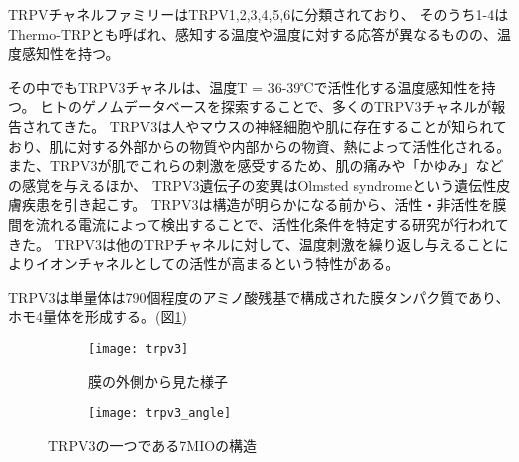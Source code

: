 TRPVチャネルファミリーはTRPV1,2,3,4,5,6に分類されており、
そのうち1-4はThermo-TRPとも呼ばれ、感知する温度や温度に対する応答が異なるものの、温度感知性を持つ。\autocite{baylie_trpv_2011}

その中でもTRPV3チャネルは、温度T = 36-39℃で活性化する温度感知性を持つ。\autocite{baylie_trpv_2011,xuTRPV3CalciumpermeableTemperaturesensitive2002}
ヒトのゲノムデータベースを探索することで、多くのTRPV3チャネルが報告されてきた。\autocite{smithTRPV3TemperaturesensitiveVanilloid2002, xuTRPV3CalciumpermeableTemperaturesensitive2002, peier_heat-sensitive_2002}
TRPV3は人やマウスの神経細胞や肌に存在することが知られており、肌に対する外部からの物質や内部からの物資、熱によって活性化される。%
また、TRPV3が肌でこれらの刺激を感受するため、肌の痛みや「かゆみ」などの感覚を与えるほか、
TRPV3遺伝子の変異はOlmsted syndromeという遺伝性皮膚疾患を引き起こす。\autocite{lin_exome_2012,lai-cheong_recurrent_2012,nilius_trpv_2013}
TRPV3は構造が明らかになる前から、活性・非活性を膜間を流れる電流によって検出することで、活性化条件を特定する研究が行われてきた。
\autocite{smithTRPV3TemperaturesensitiveVanilloid2002,xuTRPV3CalciumpermeableTemperaturesensitive2002,nadezhdinStructuralMechanismHeatinduced2021,chung_2-aminoethoxydiphenyl_2004}
TRPV3は他のTRPチャネルに対して、温度刺激を繰り返し与えることによりイオンチャネルとしての活性が高まるという特性がある。
\autocite{peier_heat-sensitive_2002,chung_2-aminoethoxydiphenyl_2004,liu_hysteresis_2011}

TRPV3は単量体は790個程度のアミノ酸残基で構成された膜タンパク質であり、ホモ4量体を形成する。(図\ref{fig:trpv3})

\begin{figure}
  \centering
  \begin{subfigure}{0.4\textwidth}
    \texttt{[image: trpv3]}
    \caption{膜の外側から見た様子}
    \label{fig:trpv3}
  \end{subfigure}
  \begin{subfigure}{0.4\textwidth}
    \texttt{[image: trpv3\_angle]}
    \label{fig:trpv3_angle}
  \end{subfigure}
  \caption{TRPV3の一つである7MIOの構造}
  \label{fig:trpv3_structures}
\end{figure}

